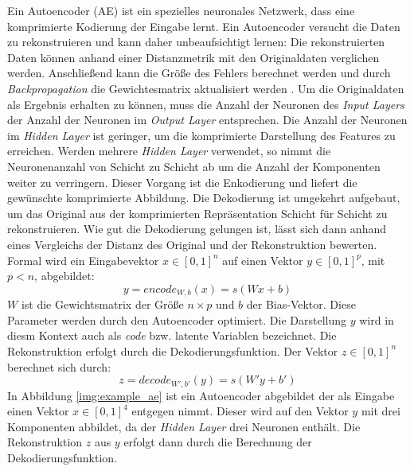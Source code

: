 Ein Autoencoder (AE) ist ein spezielles neuronales Netzwerk, dass eine komprimierte Kodierung der Eingabe lernt. Ein Autoencoder versucht die Daten zu rekonstruieren und kann daher unbeaufsichtigt lernen: Die rekonstruierten Daten können anhand einer Distanzmetrik mit den Originaldaten verglichen werden. Anschließend kann die Größe des Fehlers berechnet werden und durch \textit{Backpropagation} die Gewichtesmatrix aktualisiert werden \cite{ssn1997}.
Um die Originaldaten als Ergebnis erhalten zu können, muss die Anzahl der Neuronen des \textit{Input Layers} der Anzahl der Neuronen im \textit{Output Layer} entsprechen. Die Anzahl der Neuronen im \textit{Hidden Layer} ist geringer, um die komprimierte Darstellung des Features zu erreichen. Werden mehrere \textit{Hidden Layer} verwendet, so nimmt die Neuronenanzahl von Schicht zu Schicht ab um die Anzahl der Komponenten weiter zu verringern. Dieser Vorgang ist die Enkodierung und liefert die gewünschte komprimierte Abbildung. Die Dekodierung ist umgekehrt aufgebaut, um das Original aus der komprimierten Repräsentation Schicht für Schicht zu rekonstruieren. Wie gut die Dekodierung gelungen ist, lässt sich dann anhand eines Vergleichs der Distanz des Original und der Rekonstruktion bewerten.\newline
Formal wird ein Eingabevektor $x \in [0,1]^n$ auf einen Vektor $y \in [0,1]^p$, mit $p < n$, abgebildet: 
$$y = encode_{W,b}(x) = s(Wx + b)$$
$W$ ist die Gewichtsmatrix der Größe $n \times p$ und $b$ der Bias-Vektor. Diese Parameter werden durch den Autoencoder optimiert. Die Darstellung $y$ wird in diesm Kontext auch als \textit{code} bzw. latente Variablen bezeichnet. Die Rekonstruktion erfolgt durch die Dekodierungsfunktion. Der Vektor $z \in [0, 1]^n$ berechnet sich durch: 
$$z = decode_{W', b'}(y) = s(W'y + b')$$
In Abbildung \ref{img:example_ae} ist ein Autoencoder abgebildet der als Eingabe einen Vektor $x \in [0,1]^4$ entgegen nimmt. Dieser wird auf den Vektor $y$ mit drei Komponenten abbildet, da der \textit{Hidden Layer} drei Neuronen enthält. Die Rekonstruktion $z$ aus $y$ erfolgt dann durch die Berechnung der Dekodierungsfunktion.

